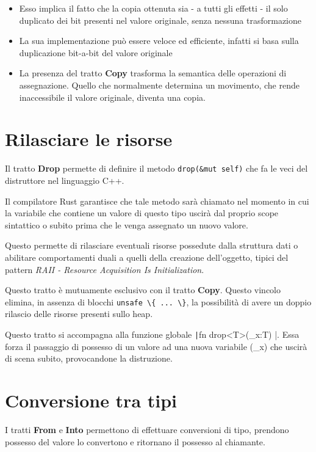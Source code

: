 \begin{itemize}
  \item Esso implica il fatto che la copia ottenuta sia - a tutti gli effetti
        - il solo duplicato dei bit presenti nel valore originale, senza nessuna
        trasformazione

  \item La sua implementazione può essere veloce ed efficiente, infatti si basa sulla
        duplicazione bit-a-bit del valore originale

  \item La presenza del tratto \textbf{Copy} trasforma la semantica delle operazioni di assegnazione.
        Quello che normalmente determina un movimento, che rende inaccessibile il
        valore originale, diventa una copia.
\end{itemize}

\section{Rilasciare le risorse}

Il tratto \textbf{Drop} permette di definire il metodo \verb|drop(&mut self)| che fa le veci
del distruttore nel linguaggio C++.

Il compilatore Rust garantisce che tale metodo sarà chiamato nel momento in cui
la variabile che contiene un valore di questo tipo uscirà dal proprio scope
sintattico o subito prima che le venga assegnato un nuovo valore.


Questo permette di rilasciare eventuali risorse possedute dalla struttura dati o
abilitare comportamenti duali a quelli della creazione dell'oggetto, tipici del
pattern \textit{RAII - Resource Acquisition Is Initialization}.

Questo tratto è mutuamente esclusivo con il tratto \textbf{Copy}. Questo vincolo
elimina, in assenza di blocchi \verb|unsafe \{ ... \}|, la possibilità di avere un
doppio rilascio delle risorse presenti sullo heap.

Questo tratto si accompagna alla funzione globale \texttt|fn drop<T>(_x:T) {}|.
Essa forza il passaggio di possesso di un valore ad una nuova variabile (\_x)
che uscirà di scena subito, provocandone la distruzione.

\section{Conversione tra tipi}
I tratti \textbf{From} e \textbf{Into} permettono di effettuare conversioni di tipo, prendono
possesso del valore lo convertono e ritornano il possesso al chiamante.


